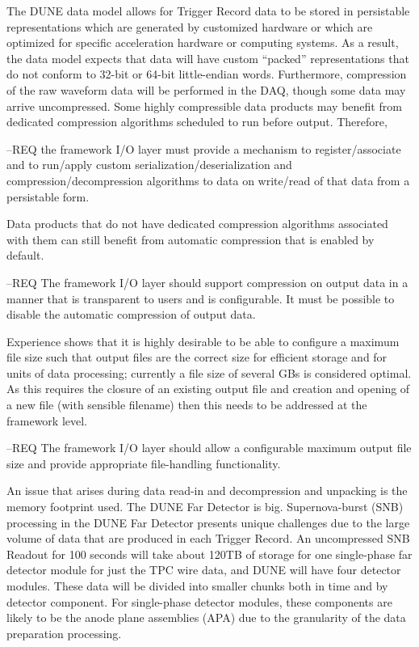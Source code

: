 \documentclass[../main-v1.tex]{subfiles}
\begin{document}
The DUNE data model allows for Trigger Record data to be stored in persistable representations which are generated by customized hardware or which are optimized for specific acceleration hardware or computing systems.  As a result, the data model expects that data will have custom “packed” representations that do not conform to 32-bit or 64-bit little-endian words. Furthermore, compression of the raw waveform data will be performed in the DAQ, though some data may arrive uncompressed.  Some highly compressible data products may benefit from dedicated compression algorithms scheduled to run before output. Therefore, 

--REQ the framework I/O layer must provide a mechanism to register/associate and to run/apply custom serialization/deserialization and compression/decompression algorithms to data on write/read of that data from a persistable form.  

Data products that do not have dedicated compression algorithms associated with them can still benefit from automatic compression that is enabled by default.

--REQ The framework I/O layer should support compression on output data in a manner that is transparent to users and is configurable.  It must be possible to disable the automatic compression of output data.

Experience shows that it is highly desirable to be able to configure a maximum file size such that output files are the correct size for efficient storage and for units of data processing; currently a file size of several GBs is considered optimal.  As this requires the closure of an existing output file and creation and opening of a new file (with sensible filename) then this needs to be addressed at the framework level.

--REQ The framework I/O layer should allow a configurable maximum output file size and provide appropriate file-handling functionality.




An issue that arises during data read-in and decompression and unpacking is the memory footprint used.  The DUNE Far Detector is big.  Supernova-burst (SNB) processing in the DUNE Far Detector presents unique challenges due to the large volume of data that are produced in each Trigger Record.  An uncompressed SNB Readout for 100 seconds will take about 120TB of storage for one single-phase far detector module for just the TPC wire data, and DUNE will have four detector modules.  These data will be divided into smaller chunks both in time and by detector component.  For single-phase detector modules, these components are likely to be the anode plane assemblies (APA) due to the granularity of the data preparation processing.
\end{document}
